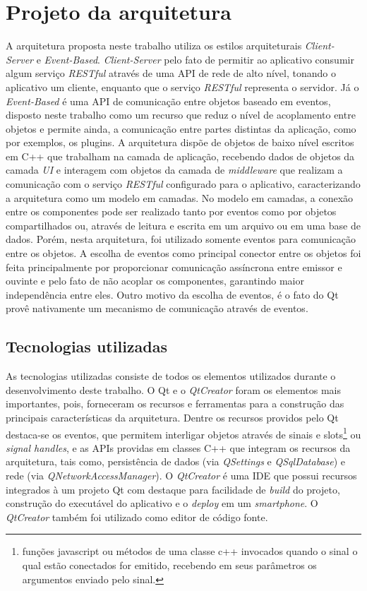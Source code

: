 \section{Projeto da arquitetura}
A arquitetura proposta neste trabalho utiliza os estilos arquiteturais \textit{Client-Server} e \textit{Event-Based}. \textit{Client-Server} pelo fato de permitir ao aplicativo consumir algum serviço \textit{RESTful} através de uma API de rede de alto nível, tonando o aplicativo um cliente, enquanto que o serviço \textit{RESTful} representa o servidor. Já o \textit{Event-Based} é uma API de comunicação entre objetos baseado em eventos, disposto neste trabalho como um recurso que reduz o nível de acoplamento entre objetos e permite ainda, a comunicação entre partes distintas da aplicação, como por exemplos, os plugins. A arquitetura dispõe de objetos de baixo nível escritos em C++ que trabalham na camada de aplicação, recebendo dados de objetos da camada \textit{UI} e interagem com objetos da camada de \textit{middleware} que realizam a comunicação com o serviço \textit{RESTful} configurado para o aplicativo, caracterizando a arquitetura como um modelo em camadas. No modelo em camadas, a conexão entre os componentes pode ser realizado tanto por eventos como por objetos compartilhados ou, através de leitura e escrita em um arquivo ou em uma base de dados. Porém, nesta arquitetura, foi utilizado somente eventos para comunicação entre os objetos. A escolha de eventos como principal conector entre os objetos foi feita principalmente por proporcionar comunicação assíncrona entre emissor e ouvinte e pelo fato de não acoplar os componentes, garantindo maior independência entre eles. Outro motivo da escolha de eventos, é o fato do Qt provê nativamente um mecanismo de comunicação através de eventos.\par


\subsection{Tecnologias utilizadas}
As tecnologias utilizadas consiste de todos os elementos utilizados durante o desenvolvimento deste trabalho. O Qt e o \textit{QtCreator} foram os elementos mais importantes, pois, forneceram os recursos e ferramentas para a construção das principais características da arquitetura. Dentre os recursos providos pelo Qt destaca-se os eventos, que permitem interligar objetos através de sinais e slots\footnote{funções javascript ou métodos de uma classe c++ invocados quando o sinal o qual estão conectados for emitido, recebendo em seus parâmetros os argumentos enviado pelo sinal.} ou \textit{signal handles}, e as APIs providas em classes C++ que integram os recursos da arquitetura, tais como, persistência de dados (via \textit{QSettings} e \textit{QSqlDatabase}) e rede (via \textit{QNetworkAccessManager}). O \textit{QtCreator} é uma IDE que possui recursos integrados à um projeto Qt com destaque para facilidade de \textit{build} do projeto, construção do executável do aplicativo e o \textit{deploy} em um \textit{smartphone}. O \textit{QtCreator} também foi utilizado como editor de código fonte.


